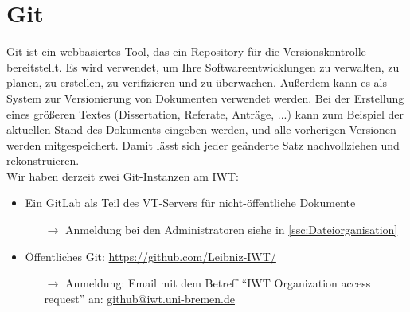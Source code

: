 \section{Git}

Git ist ein webbasiertes Tool, das ein Repository für die Versionskontrolle
bereitstellt. Es wird verwendet, um Ihre Softwareentwicklungen zu verwalten, zu
planen, zu erstellen, zu verifizieren und zu überwachen. Außerdem kann es als
System zur Versionierung von Dokumenten verwendet werden. Bei der Erstellung
eines größeren Textes (Dissertation, Referate, Anträge, ...) kann zum
Beispiel der aktuellen Stand des Dokuments eingeben werden, und alle vorherigen
Versionen werden mitgespeichert. Damit lässt sich jeder geänderte Satz
nachvollziehen und rekonstruieren.\\
Wir haben derzeit zwei Git-Instanzen am IWT:
\begin{itemize}
  \item Ein GitLab als Teil des VT-Servers für nicht-öffentliche Dokumente
        \begin{itemize}
          \item[$\rightarrow$] Anmeldung bei den Administratoren siehe in  \ref{ssc:Dateiorganisation}
        \end{itemize}
  \item Öffentliches Git: \url{https://github.com/Leibniz-IWT/}
        \begin{itemize}
          \item[$\rightarrow$] Anmeldung: Email mit dem Betreff “IWT Organization access
                               request” an: 
                               \href{mailto:github@iwt.uni-bremen.de}%
                               {github@iwt.uni-bremen.de}
        \end{itemize}
\end{itemize}
